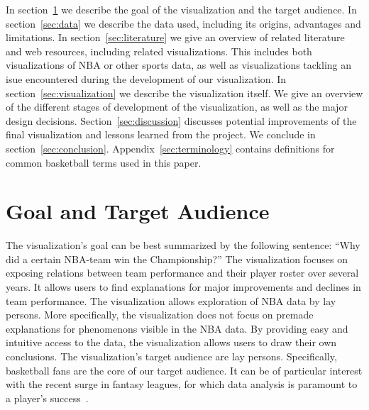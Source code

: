\documentclass[chi_draft]{sigchi}
\begin{document}
In section~\ref{sec:goal} we describe the goal of the visualization and the
target audience. In section~\ref{sec:data} we describe the data used, including
its origins, advantages and limitations. In section~\ref{sec:literature} we give
an overview of related literature and web resources, including related
visualizations.  This includes both visualizations of NBA or other sports data,
as well as visualizations tackling an isue encountered during the development of
our visualization. In section~\ref{sec:visualization} we describe the
visualization itself. We give an overview of the different stages of development
of the visualization, as well as the major design decisions.
Section~\ref{sec:discussion} discusses potential improvements of the final
visualization and lessons learned from the project. We conclude in
section~\ref{sec:conclusion}. Appendix~\ref{sec:terminology} contains
definitions for common basketball terms used in this paper.

\section{Goal and Target Audience}\label{sec:goal} 
The visualization's goal can be best summarized by the following sentence:
``Why did a certain NBA-team win the Championship?'' The visualization focuses
on exposing relations between team performance and their player roster over
several years. It allows users to find explanations for major improvements and
declines in team performance.  The visualization allows exploration of NBA data
by lay persons.  More specifically, the visualization does not focus on premade
explanations for phenomenons visible in the NBA data. By providing easy and
intuitive access to the data, the visualization allows users to draw their own
conclusions. The visualization's target audience are lay persons. Specifically,
basketball fans are the core of our target audience. It can be of particular
interest with the recent surge in fantasy leagues, for which data analysis is
paramount to a player's success~\cite{fantasy,fantasyskill}.
\end{document}
